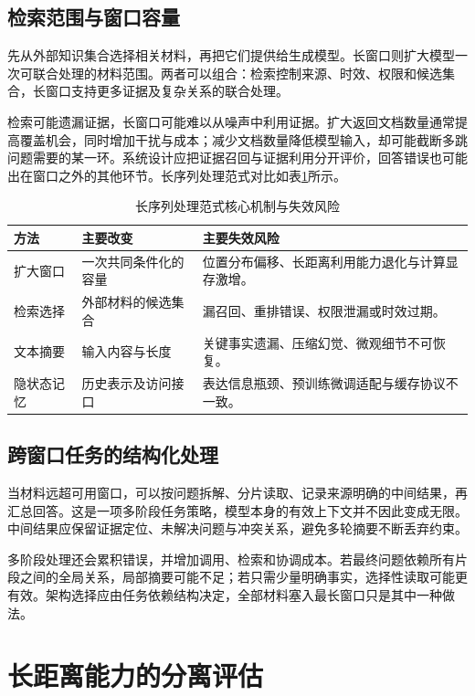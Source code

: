 \documentclass[../textbook.tex]{subfiles}
\begin{document}
\subsection{检索范围与窗口容量}
先从外部知识集合选择相关材料，再把它们提供给生成模型。长窗口则扩大模型一次可联合处理的材料范围。两者可以组合：检索控制来源、时效、权限和候选集合，长窗口支持更多证据及复杂关系的联合处理。

检索可能遗漏证据，长窗口可能难以从噪声中利用证据。扩大返回文档数量通常提高覆盖机会，同时增加干扰与成本；减少文档数量降低模型输入，却可能截断多跳问题需要的某一环。系统设计应把证据召回与证据利用分开评价，回答错误也可能出在窗口之外的其他环节。长序列处理范式对比如表\ref{tab:lc-paradigms}所示。

\begin{table}[htbp]
\centering
\caption{长序列处理范式核心机制与失效风险}\label{tab:lc-paradigms}
\begin{tabularx}{\linewidth}{lXX}
\toprule 方法 & 主要改变 & 主要失效风险\\\midrule
扩大窗口 & 一次共同条件化的容量 & 位置分布偏移、长距离利用能力退化与计算显存激增。\\
检索选择 & 外部材料的候选集合 & 漏召回、重排错误、权限泄漏或时效过期。\\
文本摘要 & 输入内容与长度 & 关键事实遗漏、压缩幻觉、微观细节不可恢复。\\
隐状态记忆 & 历史表示及访问接口 & 表达信息瓶颈、预训练微调适配与缓存协议不一致。\\
\bottomrule
\end{tabularx}
\end{table}

\subsection{跨窗口任务的结构化处理}
当材料远超可用窗口，可以按问题拆解、分片读取、记录来源明确的中间结果，再汇总回答。这是一项多阶段任务策略，模型本身的有效上下文并不因此变成无限。中间结果应保留证据定位、未解决问题与冲突关系，避免多轮摘要不断丢弃约束。

多阶段处理还会累积错误，并增加调用、检索和协调成本。若最终问题依赖所有片段之间的全局关系，局部摘要可能不足；若只需少量明确事实，选择性读取可能更有效。架构选择应由任务依赖结构决定，全部材料塞入最长窗口只是其中一种做法。

\section{长距离能力的分离评估}
\end{document}
